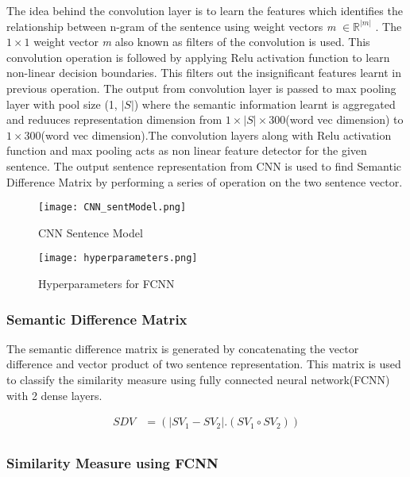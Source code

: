 \documentclass{article} %
\begin{document}
	The idea behind the convolution layer is to learn the features which identifies the relationship between n-gram of the sentence using weight vectors \textit{m} $\in \mathbb{R}^{|m|}$ . The $1 \times 1$ weight vector \textit{m} also known as filters of the convolution is used. This convolution operation is followed by applying Relu activation function to learn non-linear decision boundaries. This filters out the insignificant features learnt in previous operation. The output from convolution layer is passed to max pooling layer with pool size (1, $|S|$) where the semantic information learnt is aggregated and reduuces representation dimension from $1 \times |S| \times 300$(word vec dimension) to $1 \times 300$(word vec dimension).The convolution layers along with Relu activation function and max pooling acts as non linear  feature detector for the given sentence. The output sentence representation from CNN is used to find Semantic Difference Matrix by performing a series of operation on the two sentence vector. 
	
	\begin{figure}[!tbp]
		\centering
		\begin{minipage}[b]{0.43\textwidth}
		\centering
		\label{CNN_1}
		\texttt{[image: CNN\_sentModel.png]}
		\caption{CNN Sentence Model \cite{CNN-rank}}
		\end{minipage}
		\hfill
		\begin{minipage}[b]{0.3\textwidth}
		\centering
		\label{params}
		\texttt{[image: hyperparameters.png]}
		\caption{Hyperparameters for FCNN \cite{CNN}}
		\end{minipage}
	\end{figure}
	
	
	\subsubsection{Semantic Difference Matrix}
	The semantic difference matrix is generated by concatenating the vector difference and vector product of two sentence representation. This  matrix is used to classify the similarity measure using fully connected neural network(FCNN) with 2 dense layers. 
	
		\begin{align*} 
			SDV & =(|SV_{1}- SV_{2}|.(SV_{1} \circ SV_{2})) \\
		\end{align*}
	
	\subsubsection{Similarity Measure using FCNN}
	
\end{document}
